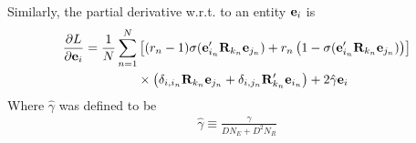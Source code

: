 \documentclass[a4paper, 12pt, fleqn]{article}
\begin{document}
Similarly, the partial derivative w.r.t. to an entity  ${\bf e}_i$ is
\begin{align}
  \frac{\partial L}{\partial {\bf e}_i} =
  \frac{1}{N}\sum_{n=1}^{N}&\left[(r_n - 1)\sigma({\bf
      e}'_{i_n}{\bf R}_{k_n}{\bf e}_{j_n}) + r_n \left( 1 - \sigma({\bf
        e}'_{i_n}{\bf R}_{k_n}{\bf e}_{j_n}) \right)\right] \nonumber \\
  &\times \left( \delta_{i,i_n}{\bf R}_{k_n}
    {\bf e}_{j_n} + \delta_{i,j_n}{\bf R}'_{k_n} {\bf
      e}_{i_n}\right) + 2\hat\gamma {\bf e}_i
\end{align}
Where $\hat\gamma$ was defined to be
\begin{align}
\hat\gamma \equiv \frac{\gamma}{DN_E+ D^2N_R}
\end{align}





\end{document}
